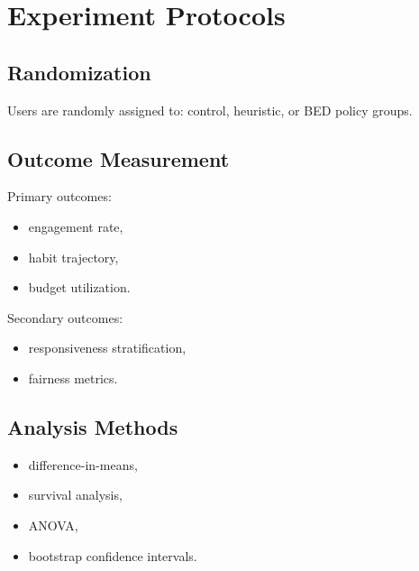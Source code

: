 \chapter{Experiment Protocols}

\section{Randomization}

Users are randomly assigned to:
control, heuristic, or BED policy groups.

\section{Outcome Measurement}

Primary outcomes:
\begin{itemize}
    \item engagement rate,
    \item habit trajectory,
    \item budget utilization.
\end{itemize}

Secondary outcomes:
\begin{itemize}
    \item responsiveness stratification,
    \item fairness metrics.
\end{itemize}

\section{Analysis Methods}

\begin{itemize}
    \item difference-in-means,
    \item survival analysis,
    \item ANOVA,
    \item bootstrap confidence intervals.
\end{itemize}
